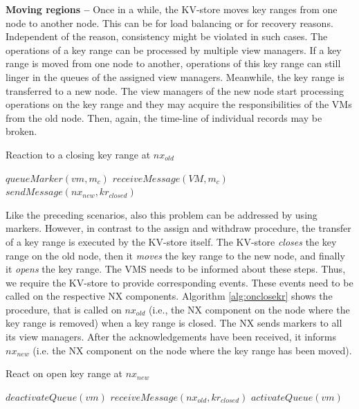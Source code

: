 \noindent
\textbf{Moving regions -- } Once in a while, the KV-store moves key 
ranges from one node to another node. This can be for load balancing or 
for recovery reasons. Independent of the reason, consistency might be violated 
in such cases. The operations of a key range can be processed by multiple view 
managers. If a key range is moved from one node to another, operations of this 
key range can still linger in the queues of the assigned view managers. 
Meanwhile, the key range is transferred to a new node. The view managers of 
the new node start processing operations on the key range and they may acquire 
the responsibilities of the VMs from the old node. Then, again, the time-line 
of individual records may be broken. 


\begin{algorithm}
\caption{Reaction to a closing key range at $nx_{old}$}
\label{alg:onclosekr}
\begin{algorithmic}[5]
\State $queueMarker(vm, m_c)$
\EndFor
{}	
\State $receiveMessage(VM, m_c)$	
\EndFor
\State $sendMessage(nx_{new}, kr_{closed})$
\EndProcedure
\end{algorithmic}
\end{algorithm}

Like the preceding scenarios, also this problem can be addressed by using
markers. However, in contrast to the assign and withdraw procedure, 
the transfer of a key range is executed by the KV-store itself. The KV-store 
\textit{closes} the key range on the old node, then it \textit{moves} 
the key range to the new node, and finally it \textit{opens} the key 
range. The VMS needs to be informed about these steps. Thus, we require 
the KV-store to provide corresponding events. These events need to be 
called on the respective NX components. Algorithm \ref{alg:onclosekr} 
shows the procedure, that is called on $nx_{old}$ (i.e., the NX 
component on the node where the key range is removed) when a key range 
is closed. The NX sends markers to all its view managers. After the 
acknowledgements have been received, it informs $nx_{new}$ (i.e. the NX 
component on the node where the key range has been moved). 



\begin{algorithm}
\caption{React on open key range at $nx_{new}$}
\label{alg:onopenkr}
\begin{algorithmic}[5]
\State $deactivateQueue(vm)$
\EndFor
\State $receiveMessage(nx_{old}, kr_{closed})$	
\State $activateQueue(vm)$
\EndFor	
\EndProcedure
\end{algorithmic}
\end{algorithm}


